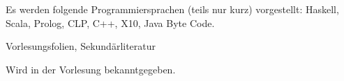 \begin{course}
\begin{content}
Es werden folgende Programmiersprachen (teils nur kurz) vorgestellt: Haskell, Scala, Prolog, CLP, C++, X10, Java Byte Code.


\end{content}

\begin{media}Vorlesungsfolien, Sekundärliteratur

\end{media}

\begin{literature}Wird in der Vorlesung bekanntgegeben.

\end{literature}



\end{course}